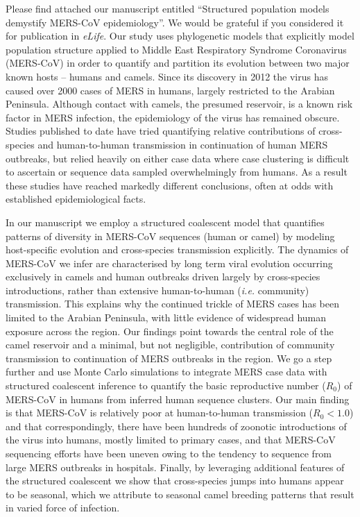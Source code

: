 \documentclass[stdletter,letterpaper,addrfromright,orderfromdateto,dateleft,11pt,noaddrto,sigleft]{newlfm}
\begin{document}
\begin{newlfm}
Please find attached our manuscript entitled ``Structured population models demystify MERS-CoV epidemiology''.
We would be grateful if you considered it for publication in \textit{eLife}.
Our study uses phylogenetic models that explicitly model population structure applied to Middle East Respiratory Syndrome Coronavirus (MERS-CoV) in order to quantify and partition its evolution between two major known hosts -- humans and camels. %
Since its discovery in 2012 the virus has caused over 2000 cases of MERS in humans, largely restricted to the Arabian Peninsula.
Although contact with camels, the presumed reservoir, is a known risk factor in MERS infection, the epidemiology of the virus has remained obscure.
Studies published to date have tried quantifying relative contributions of cross-species and human-to-human transmission in continuation of human MERS outbreaks, but relied heavily on either case data where case clustering is difficult to ascertain or sequence data sampled overwhelmingly from humans.
As a result these studies have reached markedly different conclusions, often at odds with established epidemiological facts.

In our manuscript we employ a structured coalescent model that quantifies patterns of diversity in MERS-CoV sequences (human or camel) by modeling host-specific evolution and cross-species transmission explicitly.
The dynamics of MERS-CoV we infer are characterised by long term viral evolution occurring exclusively in camels and human outbreaks driven largely by cross-species introductions, rather than extensive human-to-human (\textit{i.e.} community) transmission.
This explains why the continued trickle of MERS cases has been limited to the Arabian Peninsula, with little evidence of widespread human exposure across the region.
Our findings point towards the central role of the camel reservoir and a minimal, but not negligible, contribution of community transmission to continuation of MERS outbreaks in the region.
We go a step further and use Monte Carlo simulations to integrate MERS case data with structured coalescent inference to quantify the basic reproductive number ($R_{0}$) of MERS-CoV in humans from inferred human sequence clusters.
Our main finding is that MERS-CoV is relatively poor at human-to-human transmission ($R_{0}<1.0$) and that correspondingly, there have been hundreds of zoonotic introductions of the virus into humans, mostly limited to primary cases, and that MERS-CoV sequencing efforts have been uneven owing to the tendency to sequence from large MERS outbreaks in hospitals.
Finally, by leveraging additional features of the structured coalescent we show that cross-species jumps into humans appear to be seasonal, which we attribute to seasonal camel breeding patterns that result in varied force of infection.
 

\end{newlfm}
\end{document}
